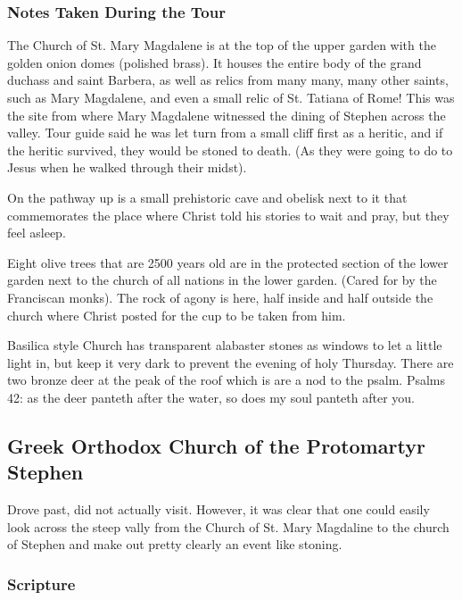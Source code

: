 \documentclass[letterpaper]{report}
\begin{document}
\subsubsection{Notes Taken During the Tour}
The Church of St. Mary Magdalene is at the top of the upper garden with the golden onion domes (polished brass).
It houses the entire body of the grand duchass and saint Barbera, as well as relics from many many, many other saints, such as Mary Magdalene,
and even a small relic of St. Tatiana of Rome! This was the site from where Mary Magdalene witnessed the dining of Stephen across the valley. Tour guide said he was let turn from a small cliff first as a heritic, and if the heritic survived, they would be stoned to death. (As they were going to do to Jesus when he walked through their midst).

On the pathway up is a small prehistoric cave and obelisk next to it that commemorates the place where Christ told his stories to wait and pray, but they feel asleep.

Eight olive trees that are 2500 years old are in the protected section of the lower garden next to the church of all nations in the lower garden. (Cared for by the Franciscan monks). The rock of agony is here, half inside and half outside the church where Christ posted for the cup to be taken from him.

Basilica style Church has transparent alabaster stones as windows to let a little light in, but keep it very dark to prevent the evening of holy Thursday.
There are two bronze deer at the peak of the roof which is are a nod to the psalm.
Psalms 42: as the deer panteth after the water, so does my soul panteth after you.

\clearpage
\subsection{Greek Orthodox Church of the Protomartyr Stephen}
\begin{multicols}{2}
	Drove past, did not actually visit.
 However, it was clear that one could easily look across the steep vally from the Church of St. Mary Magdaline to the church of Stephen and make out pretty clearly an event like stoning.
\end{multicols}
\subsubsection{Scripture}
\end{document}
